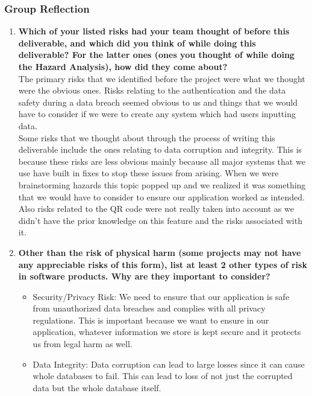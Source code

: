 \documentclass[12pt]{article}
\begin{document}
\subsubsection*{Group Reflection}
\begin{enumerate}
    \item \textbf{Which of your listed risks had your team thought of before this deliverable, and which did you think of while doing this deliverable? For the latter ones (ones you thought of while doing the Hazard Analysis), how did they come about?} \\
    The primary risks that we identified before the project were what we thought were the obvious ones. Risks relating to the authentication and the data safety during a data breach seemed obvious to us and things that we would have to consider if we were to create any system which had users inputting data. \\

    Some risks that we thought about through the process of writing this deliverable include the ones relating to data corruption and integrity. This is because these risks are less obvious mainly because all major systems that we use have built in fixes to stop these issues from arising. When we were brainstorming hazards this topic popped up and we realized it was something that we would have to consider to ensure our application worked as intended. Also risks related to the QR code were not really taken into account as we didn't have the prior knowledge on this feature and the risks associated with it. 
    \item \textbf{Other than the risk of physical harm (some projects may not have any appreciable risks of this form), list at least 2 other types of risk in software products. Why are they important to consider?}
    \begin{itemize}
        \item Security/Privacy Risk: We need to ensure that our application is safe from unauthorized data breaches and complies with all privacy regulations. This is important because we want to ensure in our application, whatever information we store is kept secure and it protects us from legal harm as well.
        \item Data Integrity: Data corruption can lead to large losses since it can cause whole databases to fail. This can lead to loss of not just the corrupted data but the whole database itself.
    \end{itemize}
\end{enumerate}
\end{document}
